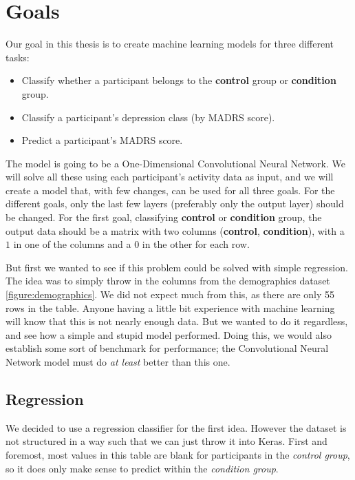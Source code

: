 \section{Goals}

Our goal in this thesis is to create machine learning models for three different tasks:

\begin{itemize}
  \item Classify whether a participant belongs to the \textbf{control} group or \textbf{condition} group.
  \item Classify a participant's depression class (by MADRS score).
  \item Predict a participant's MADRS score.
\end{itemize}

The model is going to be a One-Dimensional Convolutional Neural Network. 
We will solve all these using each participant's activity data as input, and we will create a model that, with few changes, can be used for all three goals.
For the different goals, only the last few layers (preferably only the output layer) should be changed. For the first goal, 
classifying \textbf{control} or \textbf{condition} group, the output data should be a matrix with two columns (\textbf{control}, \textbf{condition}), 
with a $1$ in one of the columns and a $0$ in the other for each row.

But first we wanted to see if this problem could be solved with simple regression. The idea was to simply throw in the columns from the 
demographics dataset \ref{figure:demographics}. We did not expect much from this, as there are only 55 rows in the table. Anyone having a little bit experience 
with machine learning will know that this is not nearly enough data. But we wanted to do it regardless, and see how a simple and stupid model performed.
Doing this, we would also establish some sort of benchmark for performance; the Convolutional Neural Network model must do \textit{at least} better than this one.

\subsection{Regression} 

We decided to use a regression classifier for the first idea. However the dataset is not structured in a way such that we can just throw it into Keras.
First and foremost, most values in this table are blank for participants in the \textit{control group}, so it does only make sense to predict within 
the \textit{condition group}. 

